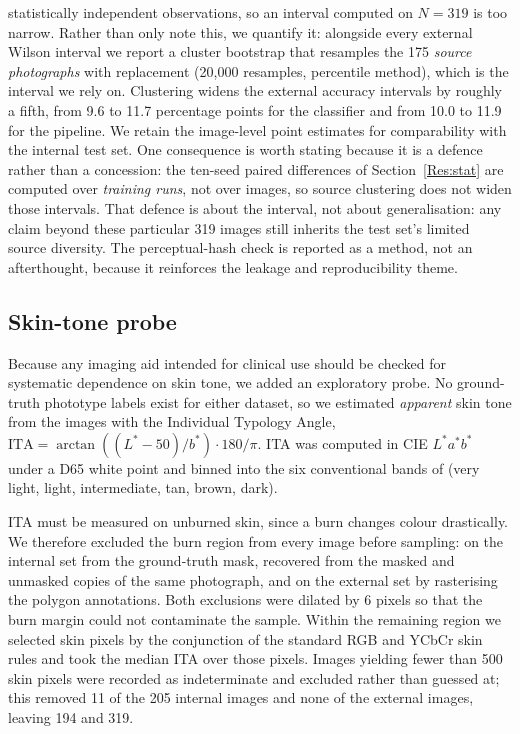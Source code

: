 \documentclass{melba}
\begin{document}
statistically independent observations, so an interval computed on $N=319$ is too narrow. Rather than only note this, we quantify it: alongside every external Wilson interval we report a cluster bootstrap that resamples the 175 \emph{source photographs} with replacement (20{,}000 resamples, percentile method), which is the interval we rely on. Clustering widens the external accuracy intervals by roughly a fifth, from 9.6 to 11.7 percentage points for the classifier and from 10.0 to 11.9 for the pipeline. We retain the image-level point estimates for comparability with the internal test set. One consequence is worth stating because it is a defence rather than a concession: the ten-seed paired differences of Section~\ref{Res:stat} are computed over \emph{training runs}, not over images, so source clustering does not widen those intervals. That defence is about the interval, not about generalisation: any claim beyond these particular 319 images still inherits the test set's limited source diversity. The perceptual-hash check is reported as a method, not an afterthought, because it reinforces the leakage and reproducibility theme.

\subsection{Skin-tone probe}
\label{Mat:ita}
Because any imaging aid intended for clinical use should be checked for systematic dependence on skin tone, we added an exploratory probe. No ground-truth phototype labels exist for either dataset, so we estimated \emph{apparent} skin tone from the images with the Individual Typology Angle, $\mathrm{ITA}=\arctan((L^{*}-50)/b^{*})\cdot 180/\pi$. ITA was computed in CIE $L^{*}a^{*}b^{*}$ under a D65 white point and binned into the six conventional bands of \citet{chardon1991} (very light, light, intermediate, tan, brown, dark).

ITA must be measured on unburned skin, since a burn changes colour drastically. We therefore excluded the burn region from every image before sampling: on the internal set from the ground-truth mask, recovered from the masked and unmasked copies of the same photograph, and on the external set by rasterising the polygon annotations. Both exclusions were dilated by 6 pixels so that the burn margin could not contaminate the sample. Within the remaining region we selected skin pixels by the conjunction of the standard RGB \citep{kovac2003} and YCbCr skin rules and took the median ITA over those pixels. Images yielding fewer than 500 skin pixels were recorded as indeterminate and excluded rather than guessed at; this removed 11 of the 205 internal images and none of the external images, leaving 194 and 319.
\end{document}
